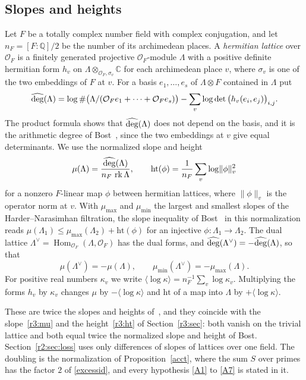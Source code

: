 \subsection{Slopes and heights}\label{r4:sec:R4conv}

Let $F$ be a totally complex number field with complex conjugation, and let $n_F=[F:\mathbb Q]/2$ be the number of its archimedean places. A \emph{hermitian lattice} over $\mathcal O_F$ is a finitely generated projective $\mathcal O_F$-module $\Lambda$ with a positive definite hermitian form $h_v$ on $\Lambda\otimes_{\mathcal O_F,\sigma_v}\mathbb C$ for each archimedean place $v$, where $\sigma_v$ is one of the two embeddings of $F$ at $v$. For a basis $e_1,\dots,e_s$ of $\Lambda\otimes F$ contained in $\Lambda$ put
\[
\widehat{\deg}(\Lambda)=\log\#\big(\Lambda/(\mathcal O_Fe_1+\dots+\mathcal O_Fe_s)\big)-\sum_v\log\det\big(h_v(e_i,e_j)\big)_{i,j}.
\]
The product formula shows that $\widehat{\deg}(\Lambda)$ does not depend on the basis, and it is the arithmetic degree of Bost~\cite{bost}, since the two embeddings at $v$ give equal determinants. We use the normalized slope and height
\begin{equation}\label{r4:R4:slope}
\mu(\Lambda)=\frac{\widehat{\deg}(\Lambda)}{n_F\,\operatorname{rk}\Lambda},\qquad \mathrm{ht}(\phi)=\frac1{n_F}\sum_v\log\lVert\phi\rVert_v^2
\end{equation}
for a nonzero $F$-linear map $\phi$ between hermitian lattices, where $\lVert\phi\rVert_v$ is the operator norm at $v$. With $\mu_{\max}$ and $\mu_{\min}$ the largest and smallest slopes of the Harder--Narasimhan filtration, the slope inequality of Bost~\cite{bost} in this normalization reads $\mu(\Lambda_1)\le\mu_{\max}(\Lambda_2)+\mathrm{ht}(\phi)$ for an injective $\phi\colon\Lambda_1\to\Lambda_2$. The dual lattice $\Lambda^\vee=\operatorname{Hom}_{\mathcal O_F}(\Lambda,\mathcal O_F)$ has the dual forms, and $\widehat{\deg}(\Lambda^\vee)=-\widehat{\deg}(\Lambda)$, so that
\begin{equation}\label{r4:R4:dual}
\mu(\Lambda^\vee)=-\mu(\Lambda),\qquad \mu_{\min}(\Lambda^\vee)=-\mu_{\max}(\Lambda).
\end{equation}
For positive real numbers $\kappa_v$ we write $\langle\log\kappa\rangle=n_F^{-1}\sum_v\log\kappa_v$. Multiplying the forms $h_v$ by $\kappa_v$ changes $\mu$ by $-\langle\log\kappa\rangle$ and $\mathrm{ht}$ of a map into $\Lambda$ by $+\langle\log\kappa\rangle$.

\begin{remark}\label{r4:R4:normrem}
These are twice the slopes and heights of~\cite{bost}, and they coincide with the slope~\eqref{r3:mu} and the height~\eqref{r3:ht} of Section~\ref{r3:sec}: both vanish on the trivial lattice and both equal twice the normalized slope and height of Bost. Section~\ref{r2:sec:loss} uses only differences of slopes of lattices over one field. The doubling is the normalization of Proposition~\ref{acct}, where the sum $S$ over primes has the factor $2$ of \eqref{excessid}, and every hypothesis \eqref{A1} to \eqref{A7} is stated in it.
\end{remark}

